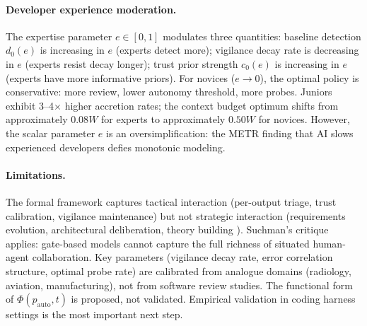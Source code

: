 \paragraph{Developer experience moderation.} The expertise parameter $e \in [0,1]$ modulates three quantities: baseline detection $d_0(e)$ is increasing in $e$ (experts detect more); vigilance decay rate is decreasing in $e$ (experts resist decay longer); trust prior strength $c_0(e)$ is increasing in $e$ (experts have more informative priors). For novices ($e \to 0$), the optimal policy is conservative: more review, lower autonomy threshold, more probes. Juniors exhibit 3--4$\times$ higher accretion rates; the context budget optimum shifts from approximately $0.08W$ for experts to approximately $0.50W$ for novices. However, the scalar parameter $e$ is an oversimplification: the METR finding that AI slows experienced developers defies monotonic modeling.

\paragraph{Limitations.} The formal framework captures tactical interaction (per-output triage, trust calibration, vigilance maintenance) but not strategic interaction (requirements evolution, architectural deliberation, theory building \citep{naur1985programming}). Suchman's critique \citep{suchman1987plans} applies: gate-based models cannot capture the full richness of situated human-agent collaboration. Key parameters (vigilance decay rate, error correlation structure, optimal probe rate) are calibrated from analogue domains (radiology, aviation, manufacturing), not from software review studies. The functional form of $\Phi(p_{\text{auto}}, t)$ is proposed, not validated. Empirical validation in coding harness settings is the most important next step.
